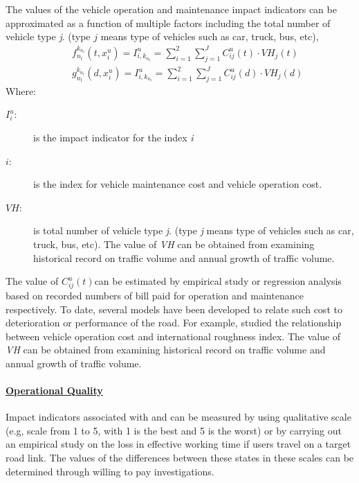 The values of the vehicle operation and maintenance impact indicators can be approximated as a function of multiple factors including the total number of vehicle type \textit{j}. (type $j$ means type of vehicles such as car, truck, bus, etc), 
\begin{eqnarray}
      && f^{k_{n_l}}_{n_l}(t,x^u_i)=I^u_{i,k_{n_l}} = \sum_{i=1}^2\sum_{j=1}^J C^u_{ij}(t) \cdot VH_j (t) \label{operation1}\\
      && g^{k_{n_l}}_{n_l}(d,x^u_i)=I^u_{i,k_{n_l}} = \sum_{i=1}^2\sum_{j=1}^J C^u_{ij}(d) \cdot VH_j (d) \label{operation2}
\end{eqnarray}
Where:
\begin{adjustwidth}{1cm}{}
\begin{description}
\item[$I_i^u$:] is the impact indicator for the index \textit{i}
\item[$i$:] is the index for vehicle maintenance cost and vehicle operation cost.
\item[$VH$:] is total number of vehicle type \textit{j}. (type \textit{\underline{j}} means type of vehicles such as car, truck, bus, etc). The value of \textit{VH} can be obtained from examining historical record on traffic volume and annual growth of traffic volume.
\end{description}
\end{adjustwidth}
%
The value of $C_{ij}^u(t)$can be estimated by empirical study or regression analysis based on recorded numbers of bill paid for operation and maintenance respectively. To date, several models have been developed to relate such cost to deterioration or performance of the road. For example,\cite{OpusCL1999} studied the relationship between vehicle operation cost and international roughness index. The value of \textit{VH} can be obtained from examining historical record on traffic volume and annual growth of traffic volume.
%
\paragraph{\underline{Operational Quality}}
Impact indicators associated with and  can be measured by using qualitative scale (e.g, scale from 1 to 5, with 1 is the best and 5 is the worst) or by carrying out an empirical study on the loss in effective working time if users travel on a target road link. The values of the differences between these states in these scales can be determined through willing to pay investigations. 

